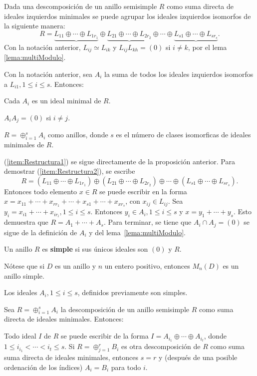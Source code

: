 Dada una descomposición de un anillo semisimple $R$ como suma directa de ideales izquierdos minimales se puede agrupar los ideales izquierdos isomorfos de la siguiente manera:
\[ R = \underbrace{L_{11}\oplus \cdots \oplus L_{1r_1}} \oplus \underbrace{L_{21}\oplus \cdots \oplus L_{2r_2}} \oplus \cdots  \oplus \underbrace{L_{s1}\oplus \cdots \oplus L_{sr_s}}. \]
Con la notación anterior, $L_{ij} \simeq L_{ik}$ y $L_{ij}L_{kh} = (0)$ si $i \neq k$, por el lema \ref{lema:multiModulo}. 
\begin{teorema}
Con la notación anterior, sea $A_i$ la suma de todos los ideales izquierdos isomorfos a $L_{i1}, 1\leq i \leq s$. Entonces:
\begin{bulletList}
\item\label{item:Restructura1} Cada $A_i$ es un ideal minimal de $R$.
\item\label{item:Restructura2} $A_iA_j = (0)$ si $i \neq j$.
\item\label{item:Restructura3} $R = \oplus_{i=1}^{s}A_i$ como anillos, donde $s$ es el número de clases isomorficas de ideales minimales de $R$.
\end{bulletList}
\end{teorema}
\begin{proof*}
(\ref{item:Restructura1}) se sigue directamente de la proposición anterior. Para demostrar (\ref{item:Restructura2}), se escribe \[ R = (L_{11}\oplus \cdots \oplus L_{1r_1}) \oplus (L_{21}\oplus \cdots \oplus L_{2r_2}) \oplus \cdots  \oplus (L_{s1}\oplus \cdots \oplus L_{sr_s}). \]Entonces todo elemento $x \in R$ se puede escribir en la forma $x = x_{11} + \cdots + x_{rr_1} + \cdots + x_{s1} +\cdots +x_{xr_s}$, con $x_{ij} \in L_{ij}$. Sea $y_i = x_{i1} + \cdots + x_{ir_i}, 1\leq i \leq s$. Entonces $y_i \in A_i, 1\leq i \leq s$ y $x = y_1 + \cdots + y_s$. Esto demuestra que $R = A_1 + \cdots + A_s$. Para terminar, se tiene que $A_i\cap A_j = (0)$ se sigue de la definición de $A_i$ y del lema~\ref{lema:multiModulo}. 
\end{proof*}
\begin{definicion}
Un anillo $R$ es \textbf{simple} si sus únicos ideales son $(0)$ y $R$.
\end{definicion}
Nótese que si $D$ es un anillo y $n$ un entero positivo, entonces $M_n(D)$ es un anillo simple.
\begin{corolario}
Los ideales $A_i, 1\leq i \leq s$, definidos previamente son simples.
\end{corolario}
\begin{proposicion}\label{prop:unicidadDescomposicion}
Sea $R = \oplus_{i=1}^s A_i$ la descomposición de un anillo semisimple $R$ como suma directa de ideales minimales. Entonces:
\begin{bulletList}
\newItem Todo ideal $I$ de $R$ se puede escribir de la forma $I = A_{i_1} \oplus \cdots \oplus A_{i_t}$, donde $1\leq i_{i_1} < \cdots < i_{t} \leq s$.
\newItem Si $R = \oplus_{j = 1}^rB_i$ es otra descomposición de $R$ como suma suma directa de ideales minimales, entonces $s = r$ y (después de una posible ordenación de los índices) $A_i = B_i$ para todo $i$.
\end{bulletList}
\end{proposicion}
